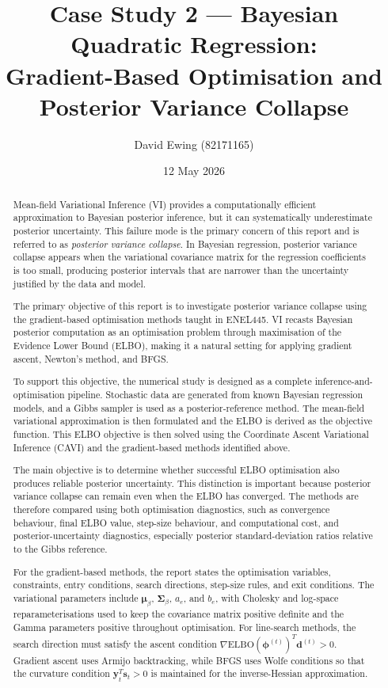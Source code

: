 \documentclass[11pt,a4paper]{article}
\title{
Case Study 2 --- Bayesian Quadratic Regression:\\[0.4em]
Gradient-Based Optimisation and Posterior Variance Collapse
}
\author{
  David Ewing (82171165)
}
\date{12 May 2026}
\newcommand{\ELBO}{\text{ELBO}}
\begin{document}
\maketitle

\begin{abstract}
\setlength{\parindent}{0pt}
\setlength{\parskip}{0.7em}

Mean-field Variational Inference (VI) provides a computationally efficient approximation to Bayesian posterior inference, but it can systematically underestimate posterior uncertainty. This failure mode is the primary concern of this report and is referred to as \emph{posterior variance collapse}. In Bayesian regression, posterior variance collapse appears when the variational covariance matrix for the regression coefficients is too small, producing posterior intervals that are narrower than the uncertainty justified by the data and model.

The primary objective of this report is to investigate posterior variance collapse using the gradient-based optimisation methods taught in ENEL445.
VI recasts Bayesian posterior computation as an optimisation problem through maximisation of the Evidence Lower Bound (ELBO),
making it a natural setting for applying gradient ascent, Newton's method, and BFGS.

To support this objective, the numerical study is designed as a complete inference-and-optimisation pipeline.
Stochastic data are generated from known Bayesian regression models, and a Gibbs sampler is used as a posterior-reference method.
The mean-field variational approximation is then formulated and the ELBO is derived as the objective function.
This ELBO objective is then solved using the
Coordinate Ascent Variational Inference (CAVI) and the gradient-based methods identified above.

The main objective is to determine whether successful ELBO optimisation also produces reliable posterior uncertainty. This distinction is important because posterior variance collapse can remain even when the ELBO has converged. The methods are therefore compared using both optimisation diagnostics, such as convergence behaviour, final ELBO value, step-size behaviour, and computational cost, and posterior-uncertainty diagnostics, especially posterior standard-deviation ratios relative to the Gibbs reference.

For the gradient-based methods, the report states the optimisation variables, constraints, entry conditions, search directions, step-size rules, and exit conditions. The variational parameters include $\bm{\mu}_\beta$, $\bm{\Sigma}_\beta$, $a_e$, and $b_e$, with Cholesky and log-space reparameterisations used to keep the covariance matrix positive definite and the Gamma parameters positive throughout optimisation. For line-search methods, the search direction must satisfy the ascent condition $\nabla\ELBO(\bm{\phi}^{(t)})^T\bm{d}^{(t)} > 0$. Gradient ascent uses Armijo backtracking, while BFGS uses Wolfe conditions so that the curvature condition $\bm{y}_t^T\bm{s}_t>0$ is maintained for the inverse-Hessian approximation.


\end{abstract}
\end{document}
